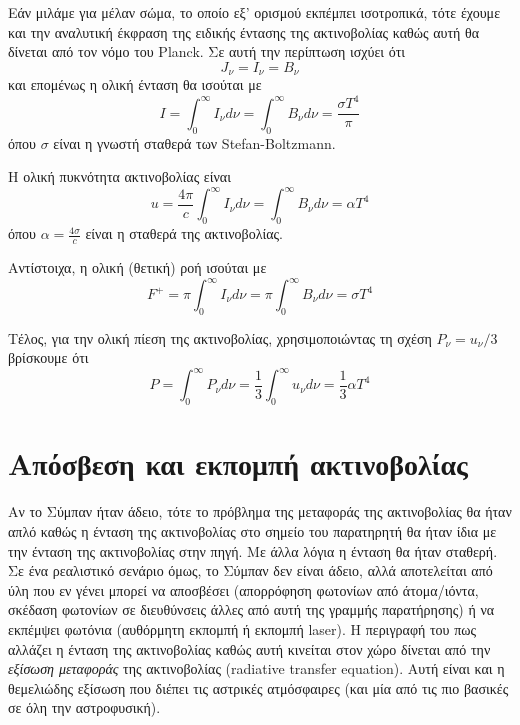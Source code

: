 Εάν μιλάμε για μέλαν σώμα, το οποίο εξ' ορισμού εκπέμπει ισοτροπικά, τότε έχουμε και την αναλυτική έκφραση της ειδικής έντασης της ακτινοβολίας καθώς αυτή θα δίνεται από τον νόμο του Planck. Σε αυτή την περίπτωση ισχύει ότι $$J_{\nu} = I_{\nu} = B_{\nu}$$
και επομένως η ολική ένταση θα ισούται με
\begin{equation}
    I = \int_{0}^{\infty} I_{\nu} d\nu = \int_{0}^{\infty} B_{\nu} d\nu = \frac{\sigma T^4}{\pi}
\end{equation}
 όπου $\sigma$ είναι η γνωστή σταθερά των Stefan-Boltzmann.
 
 Η ολική πυκνότητα ακτινοβολίας είναι 
 \begin{equation}
    \label{eq:photon_energy_density}
     u = \frac{4\pi}{c} \int_{0}^{\infty} I_{\nu} d\nu = \int_{0}^{\infty} B_{\nu} d\nu = \alpha T^4
 \end{equation}
όπου $\alpha = \frac{4\sigma}{c}$ είναι η σταθερά της ακτινοβολίας.

Αντίστοιχα, η ολική (θετική) ροή ισούται με
\begin{equation}
    F^{+} = \pi \int_{0}^{\infty} I_{\nu} d\nu = \pi \int_{0}^{\infty} B_{\nu} d\nu = \sigma T^4
\end{equation}

Τέλος, για την ολική πίεση της ακτινοβολίας, χρησιμοποιώντας τη σχέση $P_{\nu} = u_{\nu}/3$ βρίσκουμε ότι
\begin{equation}
    \label{eq:radiation_pressure_black_body}
    P = \int_{0}^{\infty} P_{\nu} d\nu = \frac{1}{3}\int_{0}^{\infty} u_{\nu} d\nu = \frac{1}{3} \alpha T^4
\end{equation}




\section{Απόσβεση και εκπομπή ακτινοβολίας}
Αν το Σύμπαν ήταν άδειο, τότε το πρόβλημα της μεταφοράς της ακτινοβολίας θα ήταν απλό καθώς η ένταση της ακτινοβολίας στο σημείο του παρατηρητή θα ήταν ίδια με την ένταση της ακτινοβολίας στην πηγή. Με άλλα λόγια η ένταση θα ήταν σταθερή. Σε ένα ρεαλιστικό σενάριο όμως, το Σύμπαν δεν είναι άδειο, αλλά αποτελείται από ύλη που εν γένει μπορεί να αποσβέσει (απορρόφηση φωτονίων από άτομα/ιόντα, σκέδαση φωτονίων σε διευθύνσεις άλλες από αυτή της γραμμής παρατήρησης) ή να εκπέμψει φωτόνια (αυθόρμητη εκπομπή ή εκπομπή laser). Η περιγραφή του πως αλλάζει η ένταση της ακτινοβολίας καθώς αυτή κινείται στον χώρο δίνεται από την \textit{εξίσωση μεταφοράς} της ακτινοβολίας (radiative transfer equation). Αυτή είναι και η θεμελιώδης εξίσωση που διέπει τις αστρικές ατμόσφαιρες (και μία από τις πιο βασικές σε όλη την αστροφυσική).



